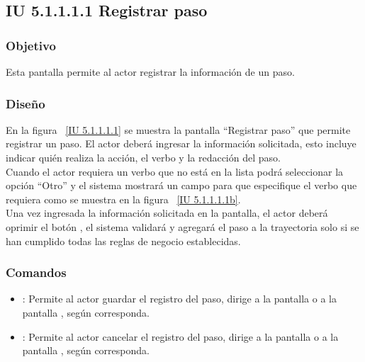 \newpage 
\subsection{IU 5.1.1.1.1 Registrar paso}

\subsubsection{Objetivo}
	
	Esta pantalla permite al actor registrar la información de un paso.

\subsubsection{Diseño}

    En la figura ~\ref{IU 5.1.1.1.1} se muestra la pantalla ``Registrar paso'' que permite registrar un paso. El actor deberá ingresar la información solicitada, 
    esto incluye indicar quién realiza la acción, el verbo y la redacción del paso.\\
    
    Cuando el actor requiera un verbo que no está en la lista podrá seleccionar la opción ``Otro'' y el sistema mostrará un campo para 
    que especifique el verbo que requiera como se muestra en la figura ~\ref{IU 5.1.1.1.1b}. \\
    
    
    Una vez ingresada la información solicitada en la pantalla, el actor deberá oprimir el botón 
    , el sistema validará y agregará el paso a la trayectoria solo si se han cumplido todas las reglas de negocio establecidas.  \\




\subsubsection{Comandos}
\begin{itemize}
	\item {}: Permite al actor guardar el registro del paso, dirige a la pantalla  o a la pantalla , según corresponda.
	\item {}: Permite al actor cancelar el registro del paso, dirige a la pantalla  o a la pantalla , según corresponda.
\end{itemize}

